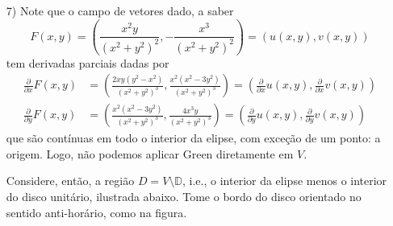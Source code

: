 \documentclass[12pt,a4paper]{article}
\begin{document}
\begin{enumerate}
	\item[7)] Note que o campo de vetores dado, a saber
	$$
	F(x,y) = \left( \frac{x^2y}{(x^2+y^2)^2}, -\frac{x^3}{(x^2+y^2)^2} \right) = (u(x,y), v(x,y))
	$$
	tem derivadas parciais dadas por
	\begin{align*}
	\frac{\partial}{\partial x}F(x,y) &= \left( \frac{2xy(y^2 - x^2)}{(x^2 + y^2)^3}, \frac{x^2(x^2-3y^2)}{(x^2+y^2)^3} \right) = \left( \frac{\partial}{\partial x}u(x,y), \frac{\partial}{\partial x}v(x,y) \right) \\
	\frac{\partial}{\partial y}F(x,y) &= \left(  \frac{x^2(x^2-3y^2)}{(x^2+y^2)^3}, \frac{4x^3y}{(x^2 + y^2)^3} \right) = \left( \frac{\partial}{\partial y}u(x,y), \frac{\partial}{\partial y}v(x,y) \right)
	\end{align*}
	que são contínuas em todo o interior da elipse, com exceção de um ponto: a origem. Logo, não podemos aplicar Green diretamente em $V$.
	
	Considere, então, a região $D = V\setminus\mathbb{D}$, i.e., o interior da elipse menos o interior do disco unitário, ilustrada abaixo. Tome o bordo do disco orientado no sentido anti-horário, como na figura.
	
	\begin{figure}[h!]
		\centering
\end{figure}
\end{enumerate}
\end{document}
